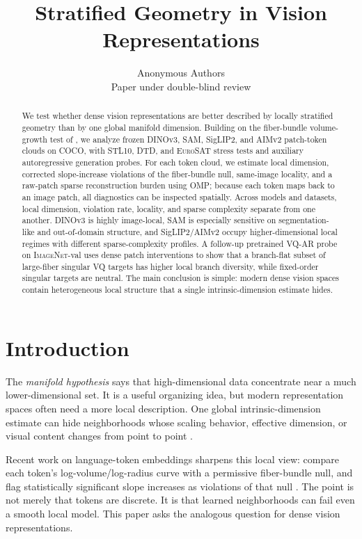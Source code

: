 \documentclass{article}
\title{Stratified Geometry in Vision Representations}
\author{
  Anonymous Authors \\
  Paper under double-blind review
}
\newcommand{\dataset}[1]{\textsc{#1}}
\begin{document}
\maketitle

\begin{abstract}
We test whether dense vision representations are better described by locally stratified geometry than by one global manifold dimension. Building on the fiber-bundle volume-growth test of \citet{robinson2025token}, we analyze frozen DINOv3, SAM, SigLIP2, and AIMv2 patch-token clouds on \dataset{COCO}, with \dataset{STL10}, \dataset{DTD}, and \dataset{EuroSAT} stress tests and auxiliary autoregressive generation probes. For each token cloud, we estimate local dimension, corrected slope-increase violations of the fiber-bundle null, same-image locality, and a raw-patch sparse reconstruction burden using OMP; because each token maps back to an image patch, all diagnostics can be inspected spatially. Across models and datasets, local dimension, violation rate, locality, and sparse complexity separate from one another. DINOv3 is highly image-local, SAM is especially sensitive on segmentation-like and out-of-domain structure, and SigLIP2/AIMv2 occupy higher-dimensional local regimes with different sparse-complexity profiles. A follow-up pretrained VQ-AR probe on \dataset{ImageNet}-val uses dense patch interventions to show that a branch-flat subset of large-fiber singular VQ targets has higher local branch diversity, while fixed-order singular targets are neutral. The main conclusion is simple: modern dense vision spaces contain heterogeneous local structure that a single intrinsic-dimension estimate hides.
\end{abstract}

\section{Introduction}
The \emph{manifold hypothesis} says that high-dimensional data concentrate near a much lower-dimensional set. It is a useful organizing idea, but modern representation spaces often need a more local description. One global intrinsic-dimension estimate can hide neighborhoods whose scaling behavior, effective dimension, or visual content changes from point to point \citep{loaiza-ganem2024deep,levina2005maximum,facco2017estimating,pope2021intrinsic,tempczyk2022lidl,tempczyk2026benchmarks}.

Recent work on language-token embeddings sharpens this local view: compare each token's log-volume/log-radius curve with a permissive fiber-bundle null, and flag statistically significant slope increases as violations of that null \citep{robinson2025token}. The point is not merely that tokens are discrete. It is that learned neighborhoods can fail even a smooth local model. This paper asks the analogous question for dense vision representations.
\end{document}

